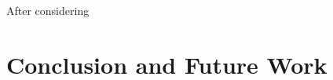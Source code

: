 \documentclass[oribibl]{llncs}
\begin{document}
After considering




\section{Conclusion and Future Work}
\label{sctn:Conclusion}




\end{document}
